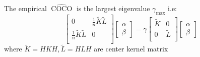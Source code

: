 \begin{theorem}
    The empirical $\widehat{\operatorname{COCO}}$ is the largest eigenvalue $\gamma_\text{max}$ i.e:
    \begin{equation*}
        \begin{bmatrix}
            0 & \frac{1}{n}\tilde{K}\tilde{L} \\
            \frac{1}{n}\tilde{K}\tilde{L} & 0 \\ 
        \end{bmatrix}
        \begin{bmatrix}
            \alpha \\ \beta
        \end{bmatrix} = \gamma\begin{bmatrix}
            \tilde{K} & 0 \\
            0 & \tilde{L} \\
        \end{bmatrix}\begin{bmatrix}
            \alpha \\ \beta
        \end{bmatrix}
    \end{equation*}
    where $\tilde{K} = HKH, \tilde{L} = HLH$ are center kernel matrix
\end{theorem}
